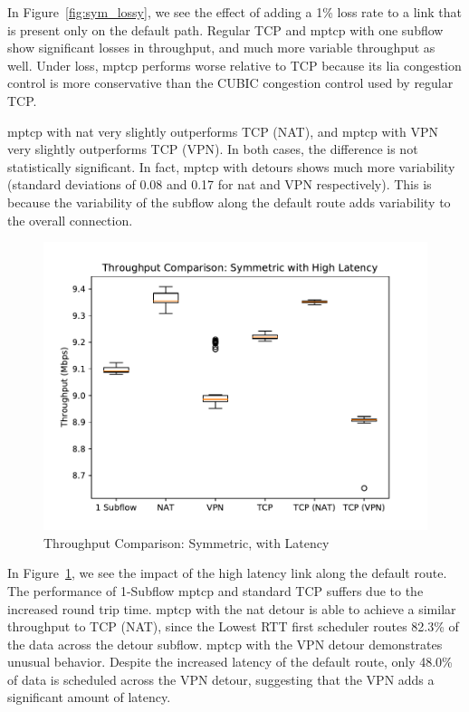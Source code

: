 \documentclass{cwru}
\begin{document}
In Figure~\ref{fig:sym_lossy}, we see the effect of adding a 1\% loss rate to a
link that is present only on the default path. Regular TCP and \ac{mptcp} with
one subflow show significant losses in throughput, and much more variable
throughput as well. Under loss, \ac{mptcp} performs worse relative to TCP
because its \ac{lia} congestion control is more conservative than the CUBIC
congestion control used by regular TCP.

\ac{mptcp} with \ac{nat} very slightly outperforms TCP (NAT), and \ac{mptcp}
with VPN very slightly outperforms TCP (VPN). In both cases, the difference is
not statistically significant. In fact, \ac{mptcp} with detours shows much more
variability (standard deviations of 0.08 and 0.17 for \ac{nat} and VPN
respectively). This is because the variability of the subflow along the default
route adds variability to the overall connection.

\begin{figure}[htbp]
  \centering
  \includegraphics[height=0.42\textheight]{figures/sym-delayed.pdf}
  \caption{Throughput Comparison: Symmetric, with Latency}
  \label{fig:sym_delayed}
\end{figure}

In Figure~\ref{fig:sym_delayed}, we see the impact of the high latency link
along the default route. The performance of 1-Subflow \ac{mptcp} and standard
TCP suffers due to the increased round trip time. \ac{mptcp} with the \ac{nat}
detour is able to achieve a similar throughput to TCP (NAT), since the Lowest
RTT first scheduler routes 82.3\% of the data across the detour subflow.
\ac{mptcp} with the VPN detour demonstrates unusual behavior. Despite the
increased latency of the default route, only 48.0\% of data is scheduled across
the VPN detour, suggesting that the VPN adds a significant amount of latency.
\end{document}
